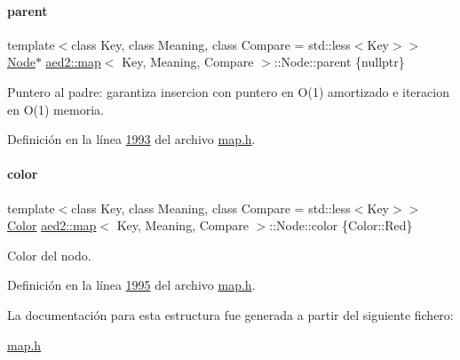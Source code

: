 \mbox{\label{structaed2_1_1map_1_1Node_ab6a5f9e471b311755e4a56834086cb90_ab6a5f9e471b311755e4a56834086cb90}} 
\paragraph{\texorpdfstring{parent}{parent}}
{\footnotesize\ttfamily template$<$class Key, class Meaning, class Compare = std\+::less$<$\+Key$>$$>$ \\
\hyperlink{structaed2_1_1map_1_1Node}{Node}$\ast$ \hyperlink{classaed2_1_1map}{aed2\+::map}$<$ Key, Meaning, Compare $>$\+::Node\+::parent \{nullptr\}}



Puntero al padre\+: garantiza insercion con puntero en O(1) amortizado e iteracion en O(1) memoria. 



Definición en la línea \hyperlink{map_8h_source_l01993}{1993} del archivo \hyperlink{map_8h_source}{map.\+h}.

\mbox{\label{structaed2_1_1map_1_1Node_a58dd9993fee8ee3eaa5716b72a3eca47_a58dd9993fee8ee3eaa5716b72a3eca47}} 
\paragraph{\texorpdfstring{color}{color}}
{\footnotesize\ttfamily template$<$class Key, class Meaning, class Compare = std\+::less$<$\+Key$>$$>$ \\
\hyperlink{classaed2_1_1map_a6d62a415a4b9d320b30cada4ebcf9f5b_a6d62a415a4b9d320b30cada4ebcf9f5b}{Color} \hyperlink{classaed2_1_1map}{aed2\+::map}$<$ Key, Meaning, Compare $>$\+::Node\+::color \{Color\+::\+Red\}}



Color del nodo. 



Definición en la línea \hyperlink{map_8h_source_l01995}{1995} del archivo \hyperlink{map_8h_source}{map.\+h}.



La documentación para esta estructura fue generada a partir del siguiente fichero\+:\begin{DoxyCompactItemize}
\item 
\hyperlink{map_8h}{map.\+h}\end{DoxyCompactItemize}
